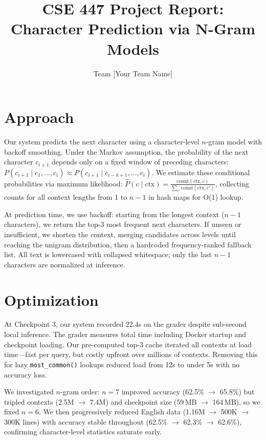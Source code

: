 \documentclass[11pt]{article}
\title{\vspace{-2.5em}CSE 447 Project Report: Character Prediction via N-Gram Models}
\author{Team [Your Team Name]}
\date{}
\begin{document}
\maketitle
\vspace{-2.5em}

\section*{Approach}

Our system predicts the next character using a character-level $n$-gram model with backoff smoothing. Under the Markov assumption, the probability of the next character $c_{i+1}$ depends only on a fixed window of preceding characters: $P(c_{i+1} \mid c_1, \dots, c_i) \approx P(c_{i+1} \mid c_{i-k+1}, \dots, c_i)$. We estimate these conditional probabilities via maximum likelihood: $\hat{P}(c \mid \text{ctx}) = \frac{\text{count}(\text{ctx}, c)}{\sum_{c'} \text{count}(\text{ctx}, c')}$, collecting counts for all context lengths from 1 to $n{-}1$ in hash maps for O(1) lookup.

At prediction time, we use backoff: starting from the longest context ($n{-}1$ characters), we return the top-3 most frequent next characters. If unseen or insufficient, we shorten the context, merging candidates across levels until reaching the unigram distribution, then a hardcoded frequency-ranked fallback list. All text is lowercased with collapsed whitespace; only the last $n{-}1$ characters are normalized at inference.

\section*{Optimization}

At Checkpoint 3, our system recorded 22.4s on the grader despite sub-second local inference. The grader measures total time including Docker startup and checkpoint loading. Our pre-computed top-3 cache iterated all contexts at load time---fast per query, but costly upfront over millions of contexts. Removing this for lazy \texttt{most\_common()} lookups reduced load from 12s to under 5s with no accuracy loss.

We investigated $n$-gram order: $n{=}7$ improved accuracy (62.5\% $\to$ 65.8\%) but tripled contexts (2.5M $\to$ 7.4M) and checkpoint size (59\,MB $\to$ 164\,MB), so we fixed $n{=}6$. We then progressively reduced English data (1.16M $\to$ 500K $\to$ 300K lines) with accuracy stable throughout (62.5\% $\to$ 62.3\% $\to$ 62.6\%), confirming character-level statistics saturate early.
\end{document}
